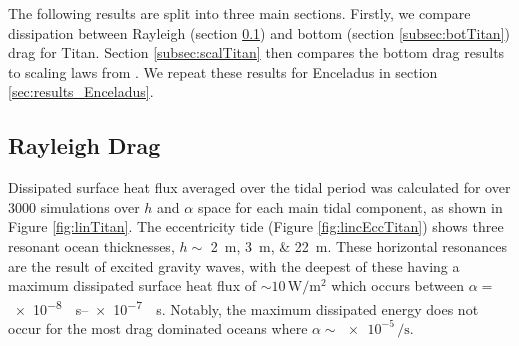 The following results are split into three main sections. Firstly, we compare dissipation between Rayleigh (section \ref{sec:ray_titan}) and bottom (section \ref{subsec:botTitan}) drag for Titan. Section \ref{subsec:scalTitan} then compares the bottom drag results to scaling laws from \citet{chen2013tidal}. We repeat these results for Enceladus in section \ref{sec:results_Enceladus}.

\subsection{Rayleigh Drag}\label{sec:ray_titan}

Dissipated surface heat flux averaged over the tidal period was calculated for over 3000 simulations over $h$ and $\alpha$ space for each main tidal component, as shown in Figure \ref{fig:linTitan}. The eccentricity tide (Figure \ref{fig:lincEccTitan}) shows three resonant ocean thicknesses, $h \sim$ \SIlist{2;3;22}{\metre}. These horizontal resonances are the result of excited gravity waves, with the deepest of these having a maximum dissipated surface heat flux of $\sim 10\, \si{\watt\per\square\metre}$ which occurs between $\alpha =$ \SIrange{e-8}{e-7}{\per\second}. Notably, the maximum dissipated energy does not occur for the most drag dominated oceans where $\alpha \sim \num{e-5} \, \si{\per\second}$. 

